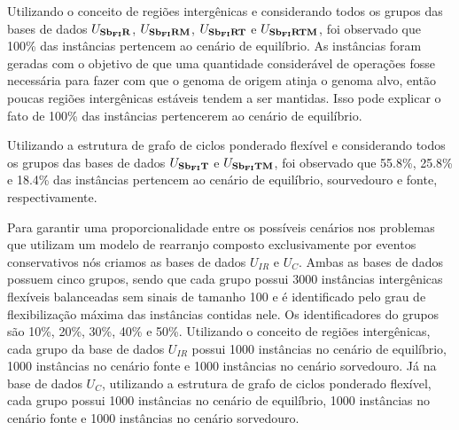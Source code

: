 

Utilizando o conceito de regiões intergênicas e considerando todos os grupos das bases de dados $U_{\textbf{Sb\textsubscript{FI}R}}{}$, $U_{\textbf{Sb\textsubscript{FI}RM}}{}$, $U_{\textbf{Sb\textsubscript{FI}RT}}{}$ e $U_{\textbf{Sb\textsubscript{FI}RTM}}{}$, foi observado que 100\% das instâncias pertencem ao cenário de equilíbrio. As instâncias foram geradas com o objetivo de que uma quantidade considerável de operações fosse necessária para fazer com que o genoma de origem atinja o genoma alvo, então poucas regiões intergênicas estáveis tendem a ser mantidas. Isso pode explicar o fato de 100\% das instâncias pertencerem ao cenário de equilíbrio.

Utilizando a estrutura de grafo de ciclos ponderado flexível e considerando todos os grupos das bases de dados $U_{\textbf{Sb\textsubscript{FI}T}}{}$ e $U_{\textbf{Sb\textsubscript{FI}TM}}{}$, foi observado que 55.8\%, 25.8\% e 18.4\% das instâncias pertencem ao cenário de equilíbrio, sourvedouro e fonte, respectivamente.

Para garantir uma proporcionalidade entre os possíveis cenários nos problemas que utilizam um modelo de rearranjo composto exclusivamente por eventos conservativos nós criamos as bases de dados $U_{IR}$ e $U_{C}$. Ambas as bases de dados possuem cinco grupos, sendo que cada grupo possui 3000 instâncias intergênicas flexíveis balanceadas sem sinais de tamanho 100 e é identificado pelo grau de flexibilização máxima das instâncias contidas nele. Os identificadores do grupos são 10\%, 20\%, 30\%, 40\% e 50\%. Utilizando o conceito de regiões intergênicas, cada grupo da base de dados $U_{IR}$ possui 1000 instâncias no cenário de equilíbrio, 1000 instâncias no cenário fonte e 1000 instâncias no cenário sorvedouro. Já na base de dados $U_{C}$, utilizando a estrutura de grafo de ciclos ponderado flexível, cada grupo possui 1000 instâncias no cenário de equilíbrio, 1000 instâncias no cenário fonte e 1000 instâncias no cenário sorvedouro.

